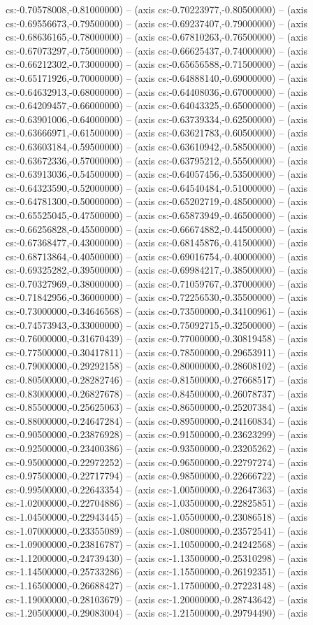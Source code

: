 cs:-0.70578008,-0.81000000) -- (axis cs:-0.70223977,-0.80500000) -- (axis cs:-0.69556673,-0.79500000) -- (axis cs:-0.69237407,-0.79000000) -- (axis cs:-0.68636165,-0.78000000) -- (axis cs:-0.67810263,-0.76500000) -- (axis cs:-0.67073297,-0.75000000) -- (axis cs:-0.66625437,-0.74000000) -- (axis cs:-0.66212302,-0.73000000) -- (axis cs:-0.65656588,-0.71500000) -- (axis cs:-0.65171926,-0.70000000) -- (axis cs:-0.64888140,-0.69000000) -- (axis cs:-0.64632913,-0.68000000) -- (axis cs:-0.64408036,-0.67000000) -- (axis cs:-0.64209457,-0.66000000) -- (axis cs:-0.64043325,-0.65000000) -- (axis cs:-0.63901006,-0.64000000) -- (axis cs:-0.63739334,-0.62500000) -- (axis cs:-0.63666971,-0.61500000) -- (axis cs:-0.63621783,-0.60500000) -- (axis cs:-0.63603184,-0.59500000) -- (axis cs:-0.63610942,-0.58500000) -- (axis cs:-0.63672336,-0.57000000) -- (axis cs:-0.63795212,-0.55500000) -- (axis cs:-0.63913036,-0.54500000) -- (axis cs:-0.64057456,-0.53500000) -- (axis cs:-0.64323590,-0.52000000) -- (axis cs:-0.64540484,-0.51000000) -- (axis cs:-0.64781300,-0.50000000) -- (axis cs:-0.65202719,-0.48500000) -- (axis cs:-0.65525045,-0.47500000) -- (axis cs:-0.65873949,-0.46500000) -- (axis cs:-0.66256828,-0.45500000) -- (axis cs:-0.66674882,-0.44500000) -- (axis cs:-0.67368477,-0.43000000) -- (axis cs:-0.68145876,-0.41500000) -- (axis cs:-0.68713864,-0.40500000) -- (axis cs:-0.69016754,-0.40000000) -- (axis cs:-0.69325282,-0.39500000) -- (axis cs:-0.69984217,-0.38500000) -- (axis cs:-0.70327969,-0.38000000) -- (axis cs:-0.71059767,-0.37000000) -- (axis cs:-0.71842956,-0.36000000) -- (axis cs:-0.72256530,-0.35500000) -- (axis cs:-0.73000000,-0.34646568) -- (axis cs:-0.73500000,-0.34100961) -- (axis cs:-0.74573943,-0.33000000) -- (axis cs:-0.75092715,-0.32500000) -- (axis cs:-0.76000000,-0.31670439) -- (axis cs:-0.77000000,-0.30819458) -- (axis cs:-0.77500000,-0.30417811) -- (axis cs:-0.78500000,-0.29653911) -- (axis cs:-0.79000000,-0.29292158) -- (axis cs:-0.80000000,-0.28608102) -- (axis cs:-0.80500000,-0.28282746) -- (axis cs:-0.81500000,-0.27668517) -- (axis cs:-0.83000000,-0.26827678) -- (axis cs:-0.84500000,-0.26078737) -- (axis cs:-0.85500000,-0.25625063) -- (axis cs:-0.86500000,-0.25207384) -- (axis cs:-0.88000000,-0.24647284) -- (axis cs:-0.89500000,-0.24160834) -- (axis cs:-0.90500000,-0.23876928) -- (axis cs:-0.91500000,-0.23623299) -- (axis cs:-0.92500000,-0.23400386) -- (axis cs:-0.93500000,-0.23205262) -- (axis cs:-0.95000000,-0.22972252) -- (axis cs:-0.96500000,-0.22797274) -- (axis cs:-0.97500000,-0.22717794) -- (axis cs:-0.98500000,-0.22666722) -- (axis cs:-0.99500000,-0.22643354) -- (axis cs:-1.00500000,-0.22647363) -- (axis cs:-1.02000000,-0.22704886) -- (axis cs:-1.03500000,-0.22825851) -- (axis cs:-1.04500000,-0.22943445) -- (axis cs:-1.05500000,-0.23086518) -- (axis cs:-1.07000000,-0.23355089) -- (axis cs:-1.08000000,-0.23572541) -- (axis cs:-1.09000000,-0.23816787) -- (axis cs:-1.10500000,-0.24242568) -- (axis cs:-1.12000000,-0.24739430) -- (axis cs:-1.13500000,-0.25310298) -- (axis cs:-1.14500000,-0.25733286) -- (axis cs:-1.15500000,-0.26192351) -- (axis cs:-1.16500000,-0.26688427) -- (axis cs:-1.17500000,-0.27223148) -- (axis cs:-1.19000000,-0.28103679) -- (axis cs:-1.20000000,-0.28743642) -- (axis cs:-1.20500000,-0.29083004) -- (axis cs:-1.21500000,-0.29794490) -- (axis 